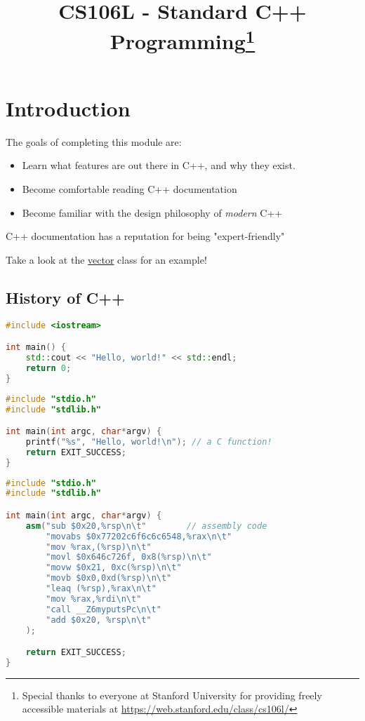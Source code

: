 \documentclass[]{article}
\title{CS106L - Standard C++ Programming\thanks{Special thanks to everyone at Stanford University for providing freely accessible materials at \href{https://web.stanford.edu/class/cs106l/}{https://web.stanford.edu/class/cs106l/}}}
\begin{document}
\maketitle
\tableofcontents

\newpage
\section{Introduction}

The goals of completing this module are:
\begin{itemize}
    \item Learn what features are out there in C++, and why they exist.
    \item Become comfortable reading C++ documentation
    \item Become familiar with the design philosophy of \emph{modern} C++
\end{itemize}

C++ documentation has a reputation for being "expert-friendly"

\begin{note}
Take a look at the \href{https://en.cppreference.com/w/cpp/container/vector}{vector} class for an example!
\end{note}

\subsection{History of C++}

\begin{minipage}{\linewidth} %
\begin{lstlisting}[language=C++, caption="Some C++ Code", breaklines=false]
#include <iostream>

int main() {
    std::cout << "Hello, world!" << std::endl;
    return 0;
}
\end{lstlisting}
\end{minipage}

\begin{lstlisting}[language=C++, caption="Also some C++ Code", breaklines=false]
#include "stdio.h"
#include "stdlib.h"

int main(int argc, char*argv) {
    printf("%s", "Hello, world!\n"); // a C function!
    return EXIT_SUCCESS;
}
\end{lstlisting}

\begin{lstlisting}[language=C++, caption="Also (technically) some C++ Code", breaklines=false]
#include "stdio.h"
#include "stdlib.h"

int main(int argc, char*argv) {
    asm("sub $0x20,%rsp\n\t"        // assembly code
        "movabs $0x77202c6f6c6c6548,%rax\n\t"
        "mov %rax,(%rsp)\n\t"
        "movl $0x646c726f, 0x8(%rsp)\n\t"
        "movw $0x21, 0xc(%rsp)\n\t"
        "movb $0x0,0xd(%rsp)\n\t"
        "leaq (%rsp),%rax\n\t"
        "mov %rax,%rdi\n\t"
        "call __Z6myputsPc\n\t"
        "add $0x20, %rsp\n\t"
    );

    return EXIT_SUCCESS;
}
\end{lstlisting}
\end{document}
